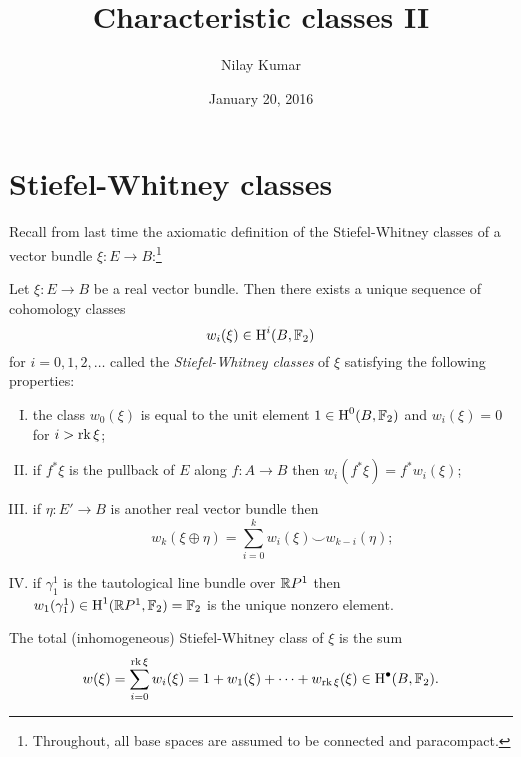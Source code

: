 \documentclass{amsart}
\title{Characteristic classes II}
\author{Nilay Kumar}
\date{January 20, 2016}
\begin{document}
\maketitle

\section{Stiefel-Whitney classes}

Recall from last time the axiomatic definition of the Stiefel-Whitney classes of a vector bundle
$\xi:E\to B$:\footnote{Throughout, all base spaces are assumed to be connected and paracompact.}
\begin{theorem}
    Let $\xi:E\to B$ be a real vector bundle. Then there exists a unique sequence of cohomology classes
    \begin{equation*}
        w_i(\xi) \in \operatorname{H}^i(B, \mathbb{F}_2)
    \end{equation*}
    for $i=0,1,2,\ldots$ called the \textit{Stiefel-Whitney classes} of $\xi$ satisfying the following
    properties:
    \begin{enumerate}[(I)]
        \item the class $w_0(\xi)$ is equal to the unit element $1\in\operatorname{H}^0(B,\mathbb{F}_2)$ and $w_i(\xi)=0$ for $i>\operatorname{rk}\xi$;
        \item if $f^*\xi$ is the pullback of $E$ along $f:A\to B$ then $w_i(f^*\xi)=f^*w_i(\xi)$;
        \item if $\eta:E'\to B$ is another real vector bundle then
            \begin{equation*}
                w_k(\xi\oplus \eta) = \sum_{i=0}^k w_i(\xi)\smile w_{k-i}(\eta);
            \end{equation*}
        \item if $\gamma_1^1$ is the tautological line bundle over $\mathbb{R} P^1$ then $w_1(\gamma_1^1)\in\operatorname{H}^1(\mathbb{R} P^1,\mathbb{F}_2)=\mathbb{F}_2$
            is the unique nonzero element.
    \end{enumerate}
    The total (inhomogeneous) Stiefel-Whitney class of $\xi$ is the sum
    \begin{equation*}
        w(\xi) = \sum_{i=0}^{\operatorname{rk}\xi}w_i(\xi) = 1 + w_1(\xi) + \cdots + w_{\operatorname{rk}\xi}(\xi)\in\operatorname{H}^\bullet(B,\mathbb{F}_2).
    \end{equation*}
    \label{sw}
\end{theorem}

\end{document}
